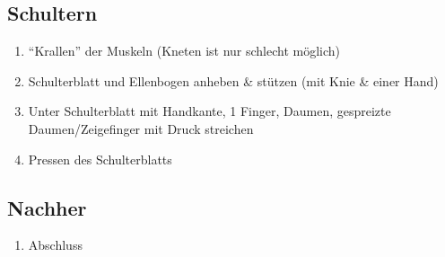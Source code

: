 \subsection{Schultern}
\begin{enumerate}
\item "`Krallen"' der Muskeln (Kneten ist nur schlecht möglich)
\item Schulterblatt und Ellenbogen anheben \& stützen (mit Knie \& einer Hand)
\item Unter Schulterblatt mit Handkante, 1 Finger, Daumen, gespreizte Dau\-men/Zei\-ge\-fin\-ger mit Druck streichen
\item Pressen des Schulterblatts
\end{enumerate}

\subsection{Nachher}
\begin{enumerate}
\item Abschluss
\end{enumerate}
